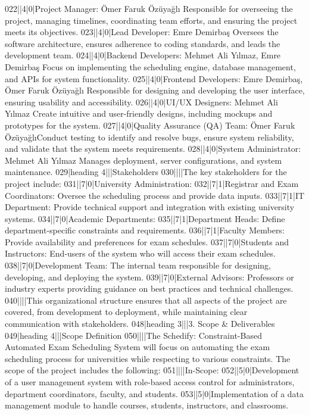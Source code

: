 022||4|0|Project Manager: Ömer Faruk Özüyağlı Responsible for overseeing the project, managing timelines, coordinating team efforts, and ensuring the project meets its objectives.
023||4|0|Lead Developer: Emre Demirbaş Oversees the software architecture, ensures adherence to coding standards, and leads the development team.
024||4|0|Backend Developers: Mehmet Ali Yılmaz, Emre Demirbaş Focus on implementing the scheduling engine, database management, and APIs for system functionality.
025||4|0|Frontend Developers: Emre Demirbaş, Ömer Faruk Özüyağlı Responsible for designing and developing the user interface, ensuring usability and accessibility.
026||4|0|UI/UX Designers: Mehmet Ali Yılmaz Create intuitive and user-friendly designs, including mockups and prototypes for the system.
027||4|0|Quality Assurance (QA) Team: Ömer Faruk ÖzüyağlıConduct testing to identify and resolve bugs, ensure system reliability, and validate that the system meets requirements.
028||4|0|System Administrator: Mehmet Ali Yılmaz Manages deployment, server configurations, and system maintenance.
029|heading 4|||Stakeholders
030||||The key stakeholders for the project include:
031||7|0|University Administration:
032||7|1|Registrar and Exam Coordinators: Oversee the scheduling process and provide data inputs.
033||7|1|IT Department: Provide technical support and integration with existing university systems.
034||7|0|Academic Departments:
035||7|1|Department Heads: Define department-specific constraints and requirements.
036||7|1|Faculty Members: Provide availability and preferences for exam schedules.
037||7|0|Students and Instructors: End-users of the system who will access their exam schedules.
038||7|0|Development Team: The internal team responsible for designing, developing, and deploying the system.
039||7|0|External Advisors: Professors or industry experts providing guidance on best practices and technical challenges.
040||||This organizational structure ensures that all aspects of the project are covered, from development to deployment, while maintaining clear communication with stakeholders.
048|heading 3|||3. Scope & Deliverables
049|heading 4|||Scope Definition
050||||The Schedify: Constraint-Based Automated Exam Scheduling System will focus on automating the exam scheduling process for universities while respecting to various constraints. The scope of the project includes the following:
051||||In-Scope:
052||5|0|Development of a user management system with role-based access control for administrators, department coordinators, faculty, and students.
053||5|0|Implementation of a data management module to handle courses, students, instructors, and classrooms.
